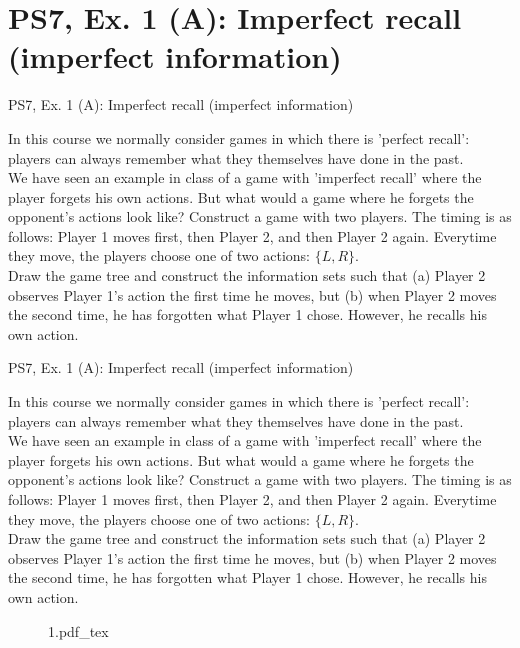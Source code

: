 \section{PS7, Ex. 1 (A): Imperfect recall (imperfect information)}

\begin{frame}{PS7, Ex. 1 (A): Imperfect recall (imperfect information)}
  \begin{multicols}{2}
    In this course we normally consider games in which there is ’perfect recall’: players can always remember what they themselves have done in the past.\\\medskip
    We have seen an example in class of a game with ’imperfect recall’ where the player forgets his own actions. But what would a game where he forgets the opponent’s actions look like? Construct a game with two players. The timing is as follows: Player 1 moves first, then Player 2, and then Player 2 again. Everytime they move, the players choose one of two actions: $\{L, R\}$.\\\medskip
    Draw the game tree and construct the information sets such that (a) Player 2 observes Player 1’s action the first time he moves, but (b) when Player 2 moves the second time, he has forgotten what Player 1 chose. However, he recalls his own action.
    \vfill\null\columnbreak
    \vfill\null
  \end{multicols}
\end{frame}
\begin{frame}{PS7, Ex. 1 (A): Imperfect recall (imperfect information)}
  \begin{multicols}{2}
    In this course we normally consider games in which there is ’perfect recall’: players can always remember what they themselves have done in the past.\\\medskip
    We have seen an example in class of a game with ’imperfect recall’ where the player forgets his own actions. But what would a game where he forgets the opponent’s actions look like? Construct a game with two players. The timing is as follows: Player 1 moves first, then Player 2, and then Player 2 again. Everytime they move, the players choose one of two actions: $\{L, R\}$.\\\medskip
    Draw the game tree and construct the information sets such that (a) Player 2 observes Player 1’s action the first time he moves, but (b) when Player 2 moves the second time, he has forgotten what Player 1 chose. However, he recalls his own action.
    \vfill\null\columnbreak
    \vfill\null
    \begin{figure}[!h]
      \center
      \def\svgwidth{\columnwidth}
      {1.pdf_tex}
    \end{figure}
  \end{multicols}
\end{frame}



